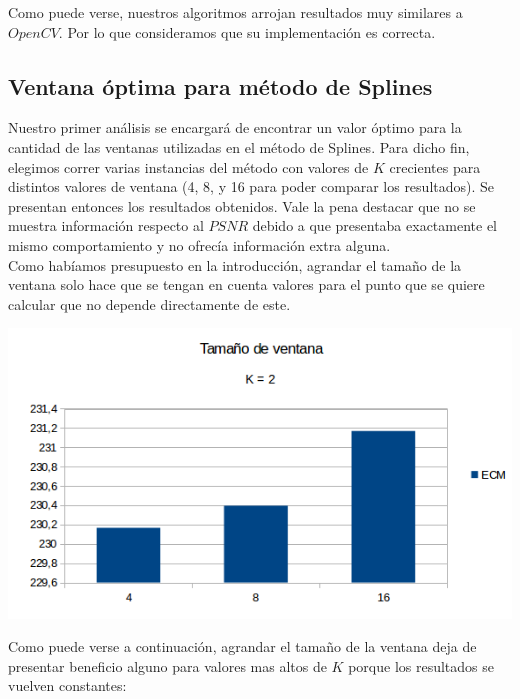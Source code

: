 Como puede verse, nuestros algoritmos arrojan resultados muy similares a $OpenCV$. Por lo que consideramos que su implementación es correcta.

\subsection{Ventana óptima para método de Splines}
Nuestro primer análisis se encargará de encontrar un valor óptimo para la cantidad de las ventanas utilizadas en el método de Splines.
Para dicho fin, elegimos correr varias instancias del método con valores de $K$ crecientes para distintos valores de ventana (4, 8, y 16 para poder comparar los resultados). Se presentan entonces los resultados obtenidos. Vale la pena destacar que no se muestra información respecto al $PSNR$ debido a que presentaba exactamente el mismo comportamiento y no ofrecía información extra alguna.
\\
Como habíamos presupuesto en la introducción, agrandar el tamaño de la ventana solo hace que se tengan en cuenta valores para el punto que se quiere calcular que no depende directamente de este.

\begin{center}
\includegraphics[scale=0.50]{imagenes/VK2.png}
\end{center}

Como puede verse a continuación, agrandar el tamaño de la ventana deja de presentar beneficio alguno para valores mas altos de $K$ porque los resultados se vuelven constantes:

